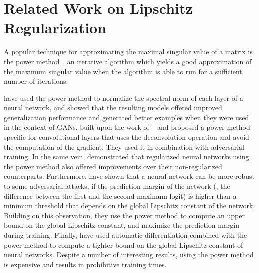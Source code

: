 \section{Related Work on Lipschitz Regularization}
\label{section:ch3-related_work_on_lipschitz_regularization}


A popular technique for approximating the maximal singular value of a matrix is the power method~\cite{golub2000eigenvalue}, an iterative algorithm which yields a good approximation of the maximum singular value when the algorithm is able to run for a sufficient number of iterations.

\citet{yoshida2017spectral, miyato2018spectral} have used the power method to normalize the spectral norm of each layer of a neural network, and showed that the resulting models offered improved generalization performance and generated better examples when they were used in the context of GANs. 
\citealt{farnia2018generalizable} built upon the work of ~\citet{miyato2018spectral} and proposed a power method specific for convolutional layers that uses the deconvolution operation and avoid the computation of the gradient.
They used it in combination with adversarial training. 
In the same vein, \citet{gouk2018regularisation} demonstrated that regularized neural networks using the power method also offered improvements over their non-regularized counterparts. 
Furthermore, \citet{tsuzuku2018lipschitz} have shown that a neural network can be more robust to some adversarial attacks,  if the prediction margin of the network (\ie, the difference between the first and the second maximum logit) is higher than a minimum threshold that depends on the global Lipschitz constant of the network.
Building on this observation, they use the power method to compute an upper bound on the global Lipschitz constant, and maximize the prediction margin during training.
Finally, \citet{scaman2018lipschitz} have used automatic differentiation combined with the power method to compute a tighter bound on the global Lipschitz constant of neural networks.
Despite a number of interesting results, using the power method is expensive and results in prohibitive training times. 

